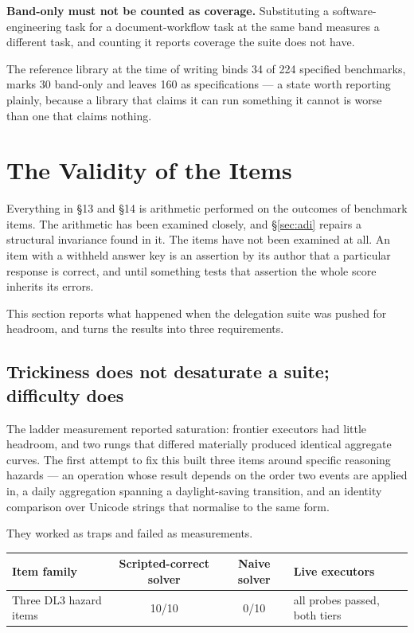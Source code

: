 \documentclass[11pt]{article}
\theoremstyle{definition}
\begin{document}
\textbf{Band-only must not be counted as coverage.} Substituting a software-engineering task for a document-workflow task at the same band measures a different task, and counting it reports coverage the suite does not have.

The reference library at the time of writing binds 34 of 224 specified benchmarks, marks 30 band-only and leaves 160 as specifications --- a state worth reporting plainly, because a library that claims it can run something it cannot is worse than one that claims nothing.

\section{The Validity of the Items}\label{sec:validity}

Everything in \S13 and \S14 is arithmetic performed on the outcomes of benchmark items. The arithmetic has been examined closely, and \S\ref{sec:adi} repairs a structural invariance found in it. The items have not been examined at all. An item with a withheld answer key is an assertion by its author that a particular response is correct, and until something tests that assertion the whole score inherits its errors.

This section reports what happened when the delegation suite was pushed for headroom, and turns the results into three requirements.

\subsection{Trickiness does not desaturate a suite; difficulty does}\label{sec:trickiness}

The ladder measurement reported saturation: frontier executors had little headroom, and two rungs that differed materially produced identical aggregate curves. The first attempt to fix this built three items around specific reasoning hazards --- an operation whose result depends on the order two events are applied in, a daily aggregation spanning a daylight-saving transition, and an identity comparison over Unicode strings that normalise to the same form.

They worked as traps and failed as measurements.

\begin{table}[h]
\centering\small
\begin{tabularx}{\textwidth}{@{}lccY@{}}
\toprule
Item family & Scripted-correct solver & Naive solver & Live executors \\
\midrule
Three DL3 hazard items & 10/10 & 0/10 & all probes passed, both tiers \\
\bottomrule
\end{tabularx}
\end{table}
\end{document}
